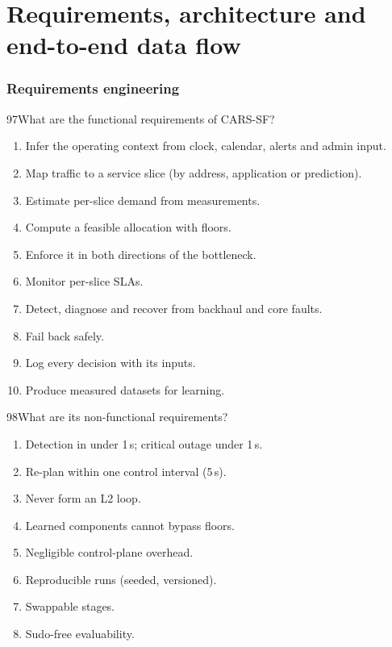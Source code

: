 \part{Requirements, architecture and end-to-end data flow}

\section{Requirements engineering}

\begin{qa}{97}{What are the functional requirements of CARS-SF?}
\begin{enumerate}[label=F\arabic*,leftmargin=2em]
\item Infer the operating context from clock, calendar, alerts and admin input.
\item Map traffic to a service slice (by address, application or prediction).
\item Estimate per-slice demand from measurements.
\item Compute a feasible allocation with floors.
\item Enforce it in both directions of the bottleneck.
\item Monitor per-slice SLAs.
\item Detect, diagnose and recover from backhaul and core faults.
\item Fail back safely.
\item Log every decision with its inputs.
\item Produce measured datasets for learning.
\end{enumerate}
\end{qa}

\begin{qa}{98}{What are its non-functional requirements?}
\begin{enumerate}[label=N\arabic*,leftmargin=2em]
\item Detection in under 1\,s; critical outage under 1\,s.
\item Re-plan within one control interval (5\,s).
\item Never form an L2 loop.
\item Learned components cannot bypass floors.
\item Negligible control-plane overhead.
\item Reproducible runs (seeded, versioned).
\item Swappable stages.
\item Sudo-free evaluability.
\end{enumerate}
\end{qa}

